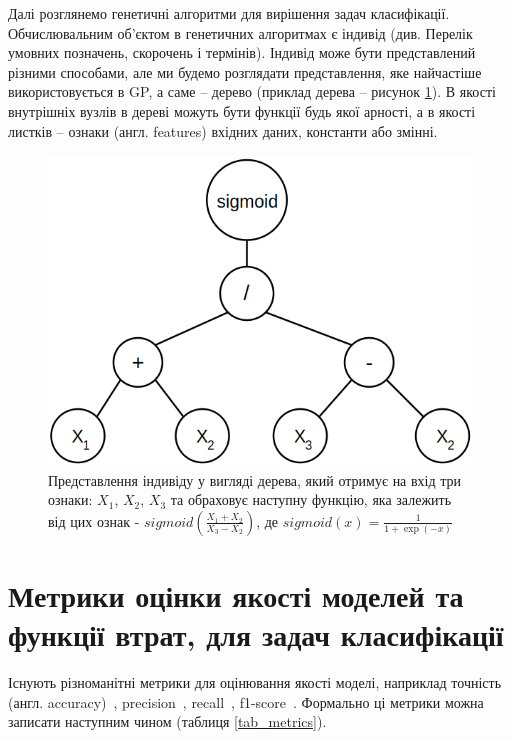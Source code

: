 Далі розглянемо генетичні алгоритми для вирішення задач класифікації. Обчислювальним об'єктом в генетичних алгоритмах є індивід (див. Перелік умовних позначень, скорочень і термінів). Індивід може бути представлений різними способами, але ми будемо розглядати представлення, яке найчастіше використовується в GP, а саме -- дерево (приклад дерева -- рисунок \ref{fig_genotype}). В якості внутрішніх вузлів в дереві можуть бути функції будь якої арності, а в якості листків -- ознаки (англ. features) вхідних даних, константи або змінні. 

\begin{figure}[ht]
	\centering
	\includegraphics[scale=0.5]{Images/genotype_example.png}
	\caption{Представлення індивіду у вигляді дерева, який отримує на вхід три ознаки: $X_1$, $X_2$, $X_3$ та обраховує наступну функцію, яка залежить від цих ознак - $sigmoid\left(\frac{X_1 + X_2}{X_3 - X_2}\right)$, де $sigmoid(x) = \frac{1}{1 + \exp(-x)}$}
	\label{fig_genotype}
\end{figure}

\section{Метрики оцінки якості моделей та функції втрат, для задач класифікації}\label{sec:metrics}


Існують різноманітні метрики для оцінювання якості моделі, наприклад точність (англ. accuracy)~\cite{ct6}, precision~\cite{ct6}, recall~\cite{ct7}, f1-score~\cite{ct8}. Формально ці метрики можна записати наступним чином (таблиця \ref{tab_metrics}).

